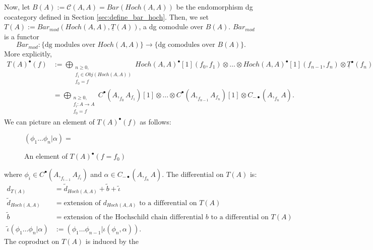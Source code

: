 Now, let $B(A) := \mathcal{C}(A,A) = 
Bar(Hoch(A,A))$ be the 
endomorphism dg cocategory 
defined in Section \ref{sec:define_bar_hoch}. 
Then, we set $T(A):= Bar_{mod}(Hoch(A,A), 
\underline{T}(A))$, a dg comodule over $B(A)$. 
$Bar_{mod}$ is a functor
$$Bar_{mod}: \{\textrm{dg modules over }Hoch(A,A)\} \to 
\{\textrm{dg comodules over }B(A)\}.$$
More explicitly, 
%
\begin{align*}
T(A)^\bullet(f) 
&:= \bigoplus \limits_{\substack{
	n \geq 0,\\
	f_i \in Obj(Hoch(A,A))\\
	f_0 = f}}
Hoch(A,A)^\bullet[1](f_0,f_1) \otimes 
\dots \otimes 
Hoch(A,A)^\bullet[1](f_{n-1},f_n) \otimes 
\underline{T}^\bullet(f_n)\\
&= \bigoplus \limits_{\substack{
	n \geq 0,\\
	f_i:A \to A\\
	f_0 = f}}
C^\bullet(A,  _{f_0}A_{f_1})[1] \otimes \dots \otimes 
C^\bullet(A, _{f_{n-1}}A_{f_n})[1] \otimes 
C_{-\bullet}(A, _{f_n}A ).
\end{align*}
%
We can picture an element of $T(A)^\bullet(f)$ 
as follows:
%
\begin{figure}[H]
\centerline{
$(\phi_1 \dots \phi_n| \alpha) = $
}
\caption{An element of $T(A)^\bullet(f=f_0)$}
\end{figure}
%
where $\phi_i \in C^\bullet(A, _{f_{i-1}}A_{f_i})$
and $\alpha \in C_{-\bullet}(A, _{f_n}A)$. The 
differential on $T(A)$ is:
%
\begin{align*}
d_{T(A)} 
&=
\tilde{d}_{Hoch(A,A)} + \tilde{b} + \tilde{\iota}\\
%
\tilde{d}_{Hoch(A,A)} 
&=
\textrm{extension of $d_{Hoch(A,A)}$ 
to a differential on $T(A)$}\\
%
\tilde{b}
&=
\textrm{extension of the Hochschild chain 
differential $b$ to a differential on $T(A)$}\\
%
\tilde{\iota}(\phi_1 \dots \phi_n|\alpha) 
&:=
(\phi_1 \dots \phi_{n-1}| \iota(\phi_n, \alpha)).
\end{align*}
%
The coproduct on $T(A)$ is induced by the 
